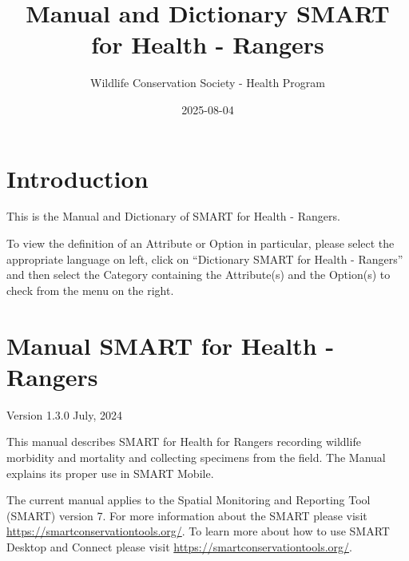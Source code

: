 \documentclass[
  letterpaper,
  DIV=11,
  numbers=noendperiod]{scrreprt}
\title{Manual and Dictionary SMART for Health - Rangers}
\author{Wildlife Conservation Society - Health Program}
\date{2025-08-04}
\renewcommand*\contentsname{Table of contents}
\newcommand\contentsname{Table of contents}
\begin{document}
\maketitle
\ifdefined\Shaded\renewenvironment{Shaded}{\begin{tcolorbox}[sharp corners, enhanced, borderline west={3pt}{0pt}{shadecolor}, boxrule=0pt, interior hidden, breakable, frame hidden]}{\end{tcolorbox}}\fi

\renewcommand*\contentsname{Table of contents}
{
\hypersetup{linkcolor=}
\setcounter{tocdepth}{2}
\tableofcontents
}

\hypertarget{introduction}{%
\chapter*{Introduction}\label{introduction}}


This is the Manual and Dictionary of SMART for Health - Rangers.

To view the definition of an Attribute or Option in particular, please
select the appropriate language on left, click on ``Dictionary SMART for
Health - Rangers'' and then select the Category containing the
Attribute(s) and the Option(s) to check from the menu on the right.


\hypertarget{manual-smart-for-health---rangers}{%
\chapter*{Manual SMART for Health -
Rangers}\label{manual-smart-for-health---rangers}}


Version 1.3.0 July, 2024

This manual describes SMART for Health for Rangers recording wildlife
morbidity and mortality and collecting specimens from the field. The
Manual explains its proper use in SMART Mobile.

The current manual applies to the Spatial Monitoring and Reporting Tool
(SMART) version 7. For more information about the SMART please visit
\url{https://smartconservationtools.org/}. To learn more about how to
use SMART Desktop and Connect please visit
\url{https://smartconservationtools.org/}.
\end{document}
